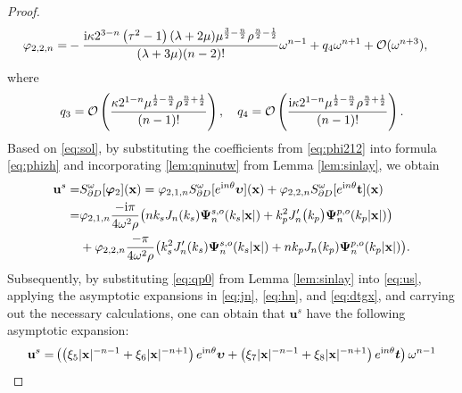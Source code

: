 \documentclass[10pt,a4paper]{amsart}
\newcommand{\bu}{\mathbf{u}}
\newcommand{\bx}{\mathbf{x}}
\begin{document}
\begin{proof}
\begin{align}
		\varphi _{2,2,n}=&-\frac{\mathrm{i} \kappa 2^{3-n} \left(\tau ^2-1\right) (\lambda +2 \mu ) \mu ^{\frac{3}{2}-\frac{n}{2}} \rho ^{\frac{n}{2}-\frac{1}{2}}}{(\lambda +3 \mu ) (n-2)!}\omega ^{n-1}+q_{4}\omega ^{n+1}+ \mathcal{O}(\omega^{n+3}), \notag
	\end{align}
	where
	\begin{align}
		q_{3}=\mathcal{O}\left(\frac{\kappa 2^{1-n}  \mu ^{\frac{1}{2}-\frac{n}{2}} \rho ^{\frac{n}{2}+\frac{1}{2}}}{(n-1)!}\right),\quad q_{4}=\mathcal{O}\left(\frac{\mathrm{i} \kappa 2^{1-n}  \mu ^{\frac{1}{2}-\frac{n}{2}} \rho ^{\frac{n}{2}+\frac{1}{2}}}{(n-1)!}\right).\notag
	\end{align}
	Based on \eqref{eq:sol}, by substituting the coefficients from \eqref{eq:phi212} into formula \eqref{eq:phizh} and incorporating  \eqref{lem:qninutw} from Lemma \ref{lem:sinlay}, we obtain 
	\begin{align}
		\bu^s =&S_{\partial D }^{\omega }[\bm{\varphi} _{2} ] (\bx) 
		=\varphi _{2,1,n}S_{\partial D }^{\omega }[e^{\mathrm{i}n\theta }\bm{\upsilon}] (\bx)+\varphi _{2,2,n}S_{\partial D }^{\omega }[e^{\mathrm{i}n\theta }\mathbf{t}] (\bx) \label{eq:us}\\
		=&\varphi _{2,1,n} \frac{-\mathrm{i}\pi}{4\omega^{2}\rho }\big(nk_{s}J_{n}(k_{s})\bm{\Psi}_{n}^{s,o}(k_{s}|\mathbf{x}|)+k_{p}^{2}J_{n}^{\prime}\big(k_{p}\big)\bm{\Psi}_{n}^{p,o}(k_{p}|\mathbf{x}|)\big) \notag\\
		&+\varphi _{2,2,n} \frac{-\pi}{4\omega^{2}\rho }\big(k_{s}^{2}J_{n}^{\prime}(k_{s})\bm{\Psi}_{n}^{s,o}(k_{s}|\mathbf{x}|)+nk_{p}J_{n}(k_{p})\bm{\Psi}_{n}^{p,o}(k_{p}|\mathbf{x}|)\big).\notag
	\end{align}
	Subsequently, by substituting \eqref{eq:qp0} from Lemma \ref{lem:sinlay} into \eqref{eq:us}, applying the asymptotic expansions in \eqref{eq:jn}, \eqref{eq:hn}, and \eqref{eq:dtgx}, and carrying out the necessary calculations, one can obtain that $\bu^s$ have the following asymptotic expansion: 
	\begin{align}
		\bu^{s}
		=&\left(\left(\xi _5|\bx|^{-n-1}+\xi_6|\bx|^{-n+1}\right)e^{\mathrm{i}n\theta }\bm{\upsilon}+\left(\xi _7|\bx|^{-n-1}+\xi_8|\bx|^{-n+1}\right)e^{\mathrm{i}n\theta }\bm{t}\right)\omega ^{n-1}\notag\\

\end{align}
\end{proof}
\end{document}
